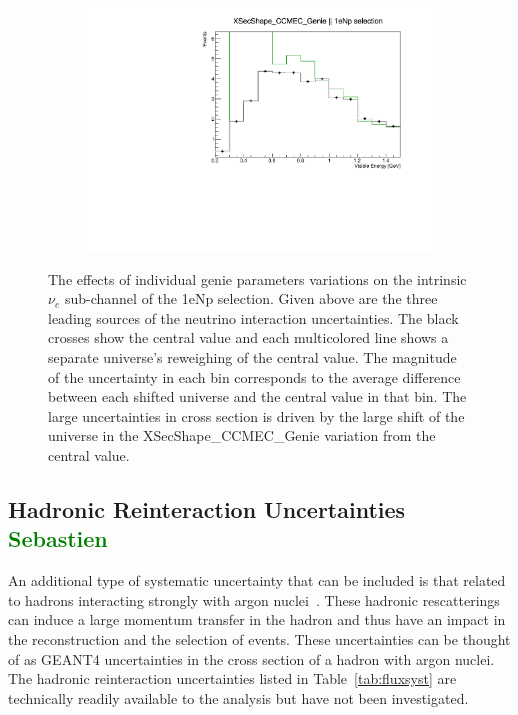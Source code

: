 \documentclass[a4paper]{article}
\begin{document}
\begin{figure}[ht]
\begin{center}
    \begin{subfigure}[b]{0.33\textwidth}
    \centering
    \includegraphics[width=1.00\textwidth]{systvariations/Variation_nue_reco_e_genietune_run1_XSecShape_CCMEC_Genie_nu_uBooNE_nue_intrinsic.pdf}
    \end{subfigure}
\caption{\label{fig:geniesystvars} The effects of individual genie parameters variations on the intrinsic $\nu_e$ sub-channel of the 1eNp selection. Given above are the three leading sources of the neutrino interaction uncertainties. The black crosses show the central value and each multicolored line shows a separate universe's reweighing of the central value. The magnitude of the  uncertainty in each bin corresponds to the average difference between each shifted universe and the central value in that bin. The large uncertainties in cross section is driven by the large shift of the universe in the XSecShape\_CCMEC\_Genie variation from the central value.}
\end{center}
\end{figure}

\subsection{Hadronic Reinteraction Uncertainties \textcolor{green}{Sebastien}}
An additional type of systematic uncertainty that can be included is that related to hadrons interacting strongly with argon nuclei~\cite{bib:reintslides}. These hadronic rescatterings can induce a large momentum transfer in the hadron and thus have an impact in the reconstruction and the selection of events. These uncertainties can be thought of as GEANT4 uncertainties in the cross section of a hadron with argon nuclei. The hadronic reinteraction uncertainties listed in Table~\ref{tab:fluxsyst} are technically readily available to the analysis but have not been investigated.
\end{document}
